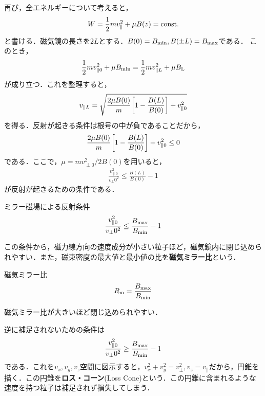 \documentclass{report}
\begin{document}
        再び，全エネルギーについて考えると，
        \begin{align}
          W = \frac{1}{2}mv_{\parallel}^2 + \mu B(z) = \mathrm{const.}
        \end{align}
        と書ける．磁気鏡の長さを$2L$とする．$B(0) = B_{\mathrm{min}},B(\pm L ) = B_{\mathrm{max}}$である．
        このとき，
        \begin{align}
          \frac{1}{2}mv_{\parallel0}^2 + \mu B_{\mathrm{min}} = \frac{1}{2}mv_{\parallel L}^2 + \mu B_{\mathrm{L}}
        \end{align}
        が成り立つ．これを整理すると，
        \begin{align}
          v_{\parallel L} = \sqrt{\frac{2\mu B(0)}{m}\qty[1 - \frac{B(L)}{B(0)}] + v_{\parallel 0}^2}
        \end{align}
        を得る．反射が起きる条件は根号の中が負であることだから，
        \begin{align}
          \frac{2\mu B(0)}{m}\qty[1 - \frac{B(L)}{B(0)}] + v_{\parallel 0}^2 \leq 0
        \end{align}
        である．ここで，$\mu = mv_{\perp0}^2/2B(0)$を用いると，
        \begin{align}
          \frac{v_{\parallel 0}^2}{v_\perp0^2} \leq \frac{B(L)}{B(0)} - 1
        \end{align}
        が反射が起きるための条件である．
        \begin{itembox}[l]{ミラー磁場による反射条件}
          \begin{align}
            \frac{v_{\parallel 0}^2}{v_\perp0^2} \leq \frac{B_{\mathrm{max}}}{B_{\mathrm{min}}} - 1
          \end{align}
        \end{itembox}
        この条件から，磁力線方向の速度成分が小さい粒子ほど，磁気鏡内に閉じ込められやすい．また，磁束密度の最大値と最小値の比を\textbf{磁気ミラー比}という．
        \begin{itembox}[l]{磁気ミラー比}
          \begin{align}
            R_{\mathrm{m}} = \frac{B_{\mathrm{max}}}{B_{\mathrm{min}}}
          \end{align}
        \end{itembox}
        磁気ミラー比が大きいほど閉じ込められやすい．

        逆に補足されないための条件は
        \begin{align}
          \frac{v_{\parallel 0}^2}{v_\perp0^2} \geq \frac{B_{\mathrm{max}}}{B_{\mathrm{min}}} - 1
        \end{align}
        である．これを$v_x,v_y,v_z$空間に図示すると，$v_x^2 + v_y^2 = v_\perp^2, v_z = v_\parallel$だから，円錐を描く．この円錐を\textbf{ロス・コーン}(Loss Cone)という．この円錐に含まれるような速度を持つ粒子は補足されず損失してしまう．
\end{document}

